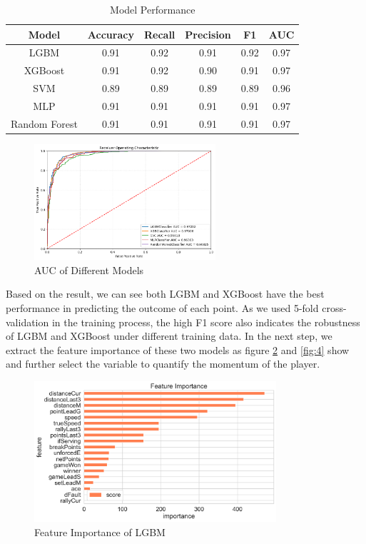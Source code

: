 \documentclass[12pt]{article}
\begin{document}
\begin{table}[h!]
\centering
\begin{tabular}{||c c c c c c||} 
 \hline
 \textbf{Model} & \textbf{Accuracy} & \textbf{Recall} & \textbf{Precision} & \textbf{F1} & \textbf{AUC} \\ [0.5ex] 
 \hline\hline
 LGBM & 0.91 & 0.92 & 0.91 & 0.92 & 0.97 \\ 
 \hline
 XGBoost & 0.91 & 0.92 & 0.90 & 0.91 & 0.97 \\
 \hline
 SVM & 0.89 & 0.89 & 0.89 & 0.89 & 0.96 \\
 \hline
 MLP & 0.91 & 0.91 & 0.91 & 0.91 & 0.97 \\
 \hline
 Random Forest & 0.91 & 0.91 & 0.91 & 0.91 & 0.97 \\
 [1ex] 
 \hline
\end{tabular}
\caption{Model Performance}
\label{table:3}
\end{table}

\begin{figure}[!h]
    \centering
    \includegraphics[width=0.6\textwidth, height=0.4\textwidth]{auc.png}
    \caption{AUC of Different Models}
    \label{fig:2}
\end{figure}

Based on the result, we can see both LGBM and XGBoost have the best performance in predicting the outcome of each point. As we used 5-fold cross-validation in the training process, the high F1 score also indicates the robustness of LGBM and XGBoost under different training data. In the next step, we extract
the feature importance of these two models as figure  \ref{fig:3} and \ref{fig:4} show and further select the variable to quantify the momentum of the player.

\begin{figure}[h!]
    \centering
    \includegraphics[width=0.8\textwidth]{feature_LGBM.png}
    \caption{Feature Importance of LGBM}
    \label{fig:3}
\end{figure}
\end{document}
